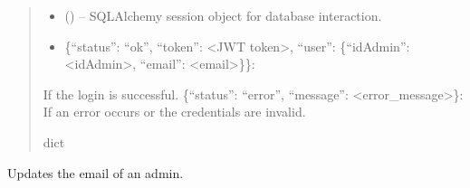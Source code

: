 \documentclass[letterpaper,10pt,english]{sphinxmanual}
\begin{document}
\begin{fulllineitems}
\begin{fulllineitems}
\begin{quote}
\begin{description}
\begin{itemize}
\item {} 
\sphinxAtStartPar
{} (\sphinxstyleliteralemphasis{\sphinxupquote{, }}) – SQLAlchemy session object for database interaction.

\end{itemize}

\sphinxAtStartPar
\begin{description}
\begin{itemize}
\item {} 
\sphinxAtStartPar
\{“status”: “ok”, “token”: <JWT token>, “user”: \{“idAdmin”: <idAdmin>, “email”: <email>\}\}:

\end{itemize}

\sphinxAtStartPar
If the login is successful.
\sphinxhyphen{} \{“status”: “error”, “message”: <error\_message>\}:
If an error occurs or the credentials are invalid.

\end{description}


\sphinxAtStartPar
dict

\end{description}\end{quote}

\end{fulllineitems}


\begin{fulllineitems}
\label{\detokenize{app.controllers:app.controllers.admin_controller.AdminController.refreshAccessToken}}
\pysigstartsignatures
\pysiglinewithargsret
{}
{}
{}
\pysigstopsignatures
\end{fulllineitems}


\begin{fulllineitems}
\label{\detokenize{app.controllers:app.controllers.admin_controller.AdminController.updateAdminEmail}}
\pysigstartsignatures
\pysiglinewithargsret
{}
{\sphinxparamcomma {}\sphinxparamcomma {}}
{}
\pysigstopsignatures
\sphinxAtStartPar
Updates the email of an admin.


\end{fulllineitems}
\end{fulllineitems}
\end{document}
